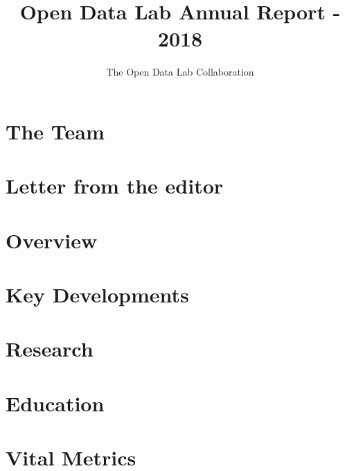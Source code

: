 \documentclass[12pt,letterpaper]{report} %
\title{Open Data Lab Annual Report - 2018}
\author{The Open Data Lab Collaboration}
\begin{document}
\maketitle

\chapter*{The Team}   %

\chapter*{Letter from the editor}   %

\tableofcontents
\pagebreak

\chapter{Overview} 

\chapter{Key Developments} 

\chapter{Research} 

\chapter{Education} 

\chapter{Vital Metrics} 

\end{document}
